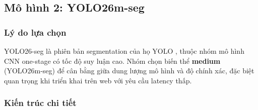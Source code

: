 \subsection{Mô hình 2: YOLO26m-seg}
\label{subsec:yolo}

\subsubsection{Lý do lựa chọn}
YOLO26-seg là phiên bản segmentation của họ YOLO \cite{ultralytics_yolo}, thuộc nhóm mô hình CNN one-stage có tốc độ suy luận cao. Nhóm chọn biến thể \textbf{medium} (YOLO26m-seg) để cân bằng giữa dung lượng mô hình và độ chính xác, đặc biệt quan trọng khi triển khai trên web với yêu cầu latency thấp.

\subsubsection{Kiến trúc chi tiết}

